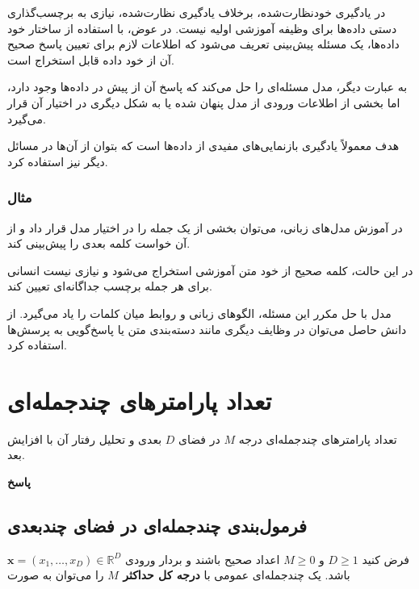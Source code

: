\documentclass[12pt,a4paper]{article}
\newcommand{\answerheading}{%
    \par\vspace{0.10em}%
    {\color{accent}\bfseries پاسخ}\par\vspace{-0.2em}%
}
\begin{document}
در یادگیری خودنظارت‌شده، برخلاف یادگیری
نظارت‌شده، نیازی به برچسب‌گذاری دستی
داده‌ها برای وظیفه آموزشی اولیه نیست.
در عوض، با استفاده از ساختار خود داده‌ها،
یک مسئله پیش‌بینی تعریف می‌شود که
اطلاعات لازم برای تعیین پاسخ صحیح آن
از خود داده قابل استخراج است.

به عبارت دیگر، مدل مسئله‌ای را حل می‌کند
که پاسخ آن از پیش در داده‌ها وجود دارد،
اما بخشی از اطلاعات ورودی از مدل پنهان
شده یا به شکل دیگری در اختیار آن قرار می‌گیرد.

هدف معمولاً یادگیری بازنمایی‌های مفیدی
از داده‌ها است که بتوان از آن‌ها
در مسائل دیگر نیز استفاده کرد.

\subsubsection{مثال}

در آموزش مدل‌های زبانی، می‌توان بخشی
از یک جمله را در اختیار مدل قرار داد
و از آن خواست کلمه بعدی را پیش‌بینی کند.

در این حالت، کلمه صحیح از خود متن آموزشی
استخراج می‌شود و نیازی نیست انسانی
برای هر جمله برچسب جداگانه‌ای تعیین کند.

مدل با حل مکرر این مسئله، الگوهای
زبانی و روابط میان کلمات را یاد می‌گیرد.
از دانش حاصل می‌توان در وظایف دیگری
مانند دسته‌بندی متن یا پاسخ‌گویی
به پرسش‌ها استفاده کرد.


\section{تعداد پارامترهای چندجمله‌ای}
\begin{promptbox}
تعداد پارامتر‌های چندجمله‌ای درجه $M$ در فضای $D$ بعدی و تحلیل رفتار آن با افزایش بعد.
\end{promptbox}
\answerheading


\subsection{فرمول‌بندی چندجمله‌ای در فضای چندبعدی}

فرض کنید $D\geq1$ و $M\geq0$ اعداد صحیح باشند و
بردار ورودی
$\mathbf{x}=(x_1,\ldots,x_D)\in\mathbb{R}^D$
باشد. یک چندجمله‌ای عمومی با \textbf{درجه کل حداکثر $M$}
را می‌توان به صورت
\end{document}
